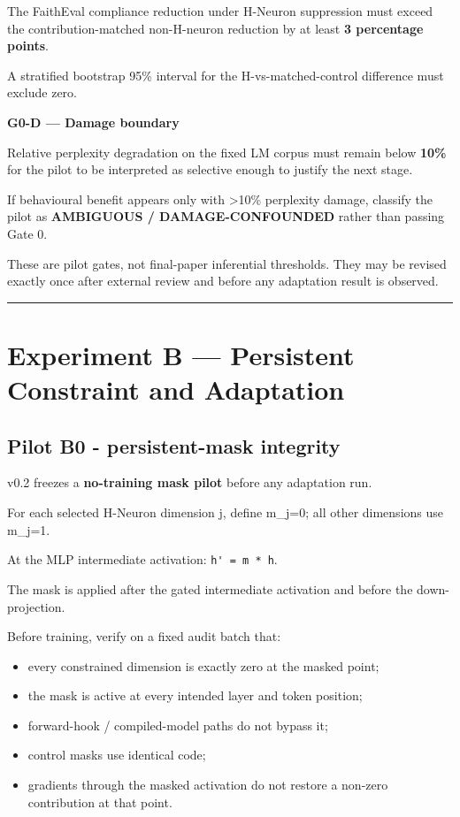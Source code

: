 The FaithEval compliance reduction under H-Neuron suppression must exceed the contribution-matched non-H-neuron reduction by at least \textbf{3 percentage points}.

A stratified bootstrap 95\% interval for the H-vs-matched-control difference must exclude zero.

\textbf{G0-D --- Damage boundary}

Relative perplexity degradation on the fixed LM corpus must remain below \textbf{10\%} for the pilot to be interpreted as selective enough to justify the next stage.

If behavioural benefit appears only with \textgreater10\% perplexity damage, classify the pilot as \textbf{AMBIGUOUS / DAMAGE-CONFOUNDED} rather than passing Gate 0.

These are pilot gates, not final-paper inferential thresholds. They may be revised exactly once after external review and before any adaptation result is observed.

\begin{center}\rule{0.5\linewidth}{0.5pt}\end{center}

\section{Experiment B --- Persistent Constraint and Adaptation}\label{experiment-b-persistent-constraint-and-adaptation}

\subsection{Pilot B0 - persistent-mask integrity}\label{pilot-b0---persistent-mask-integrity}

v0.2 freezes a \textbf{no-training mask pilot} before any adaptation run.

For each selected H-Neuron dimension j, define m\_j=0; all other dimensions use m\_j=1.

At the MLP intermediate activation: \passthrough{\lstinline!h' = m * h!}.

The mask is applied after the gated intermediate activation and before the down-projection.

Before training, verify on a fixed audit batch that:

\begin{itemize}
\tightlist
\item
  every constrained dimension is exactly zero at the masked point;
\item
  the mask is active at every intended layer and token position;
\item
  forward-hook / compiled-model paths do not bypass it;
\item
  control masks use identical code;
\item
  gradients through the masked activation do not restore a non-zero contribution at that point.
\end{itemize}

